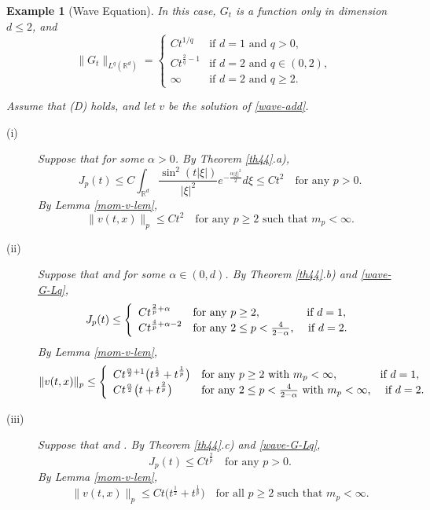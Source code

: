 \documentclass[12pt]{article}
\newtheorem{example}[theorem]{Example}
\def\bR{\mathbb{R}}
\def\k{\kappa}
\begin{document}
\begin{example}[Wave Equation]
\label{wave-ex}
In this case, $G_t$ is a function only in dimension $d\leq 2$, and
\begin{equation}
\label{wave-G-Lq}
\|G_t\|_{L^q(\bR^d)}=
\left\{
\begin{array}{ll}
C t^{1/q} & \mbox{if $d=1$ and $q>0$}, \\
C t^{\frac{2}{q}-1}& \mbox{if $d=2$ and $q\in (0,2)$}, \\
\infty & \mbox{if $d=2$ and $q \geq 2$}.
\end{array} \right.
\end{equation}

Assume that (D) holds, and let $v$ be the solution of \eqref{wave-add}. 

\begin{description}

\item[(i)] Suppose that \fbox{$\k=H_{d,\alpha/2}$} for some $\alpha>0$. By Theorem \ref{th44}.a),
\[
J_p(t) \leq C \int_{\bR^d} \frac{\sin^2(t|\xi|)}{|\xi|^2}e^{-\frac{\alpha|\xi|^2}{2}}d\xi \leq C t^2 \quad \mbox{for any $p>0$}.
\]
By Lemma \ref{mom-v-lem},
\[
\|v(t,x)\|_p \leq Ct^2 \quad \mbox{for any $p\geq 2$ such that $m_p<\infty$}.
\]


\item[(ii)] Suppose that  and \fbox{$\k=R_{d,\alpha/2}$} for some $\alpha \in (0,d)$. By Theorem \ref{th44}.b) and \eqref{wave-G-Lq},
\[
J_p(t) \leq 
\left\{
\begin{array}{ll}
C t^{\frac{2}{p}+\alpha} & \mbox{for any $p\geq 2$, \quad \quad \quad \quad if $d=1$}, \\
C t^{\frac{4}{p}+\alpha-2} & \mbox{for any $2 \leq p<\frac{4}{2-\alpha}$, \quad if $d=2$}.
\end{array} \right.
\]
By Lemma \ref{mom-v-lem},
\[
\|v(t,x)\|_p \leq 
\left\{
\begin{array}{ll}
C t^{\frac{\alpha}{2}+1} \big(t^{\frac{1}{2}}+t^{\frac{1}{p}} \big) &  \mbox{for any $p\geq 2$ with $m_p<\infty$, \quad \quad \quad \ \ if $d=1$}, \\
C t^{\frac{\alpha}{2}} \big(t+t^{\frac{2}{p}} \big)  & \mbox{for any $2 \leq p<\frac{4}{2-\alpha}$ with $m_p<\infty$, \quad if $d=2$}.
\end{array} \right.
\]

\item[(iii)] Suppose that  and \fbox{$\k\in L^1(\bR^d)$}. By Theorem \ref{th44}.c) and \eqref{wave-G-Lq},
\[
J_p(t) \leq C t^{\frac{2}{p}} \quad \mbox{for any $p>0$}.
\]
By Lemma \ref{mom-v-lem},
\[
\|v(t,x)\|_p \leq C t \big(t^{\frac{1}{2}}+t^{\frac{1}{p}} \big) \quad \mbox{for all $p\geq 2$ such that $m_p<\infty$}.
\]

\end{description}
\end{example}
\end{document}
